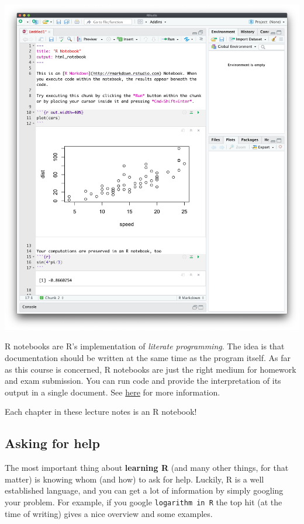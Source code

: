 \documentclass[
]{book}
\theoremstyle{definition}
\theoremstyle{definition}
\theoremstyle{definition}
\theoremstyle{definition}
\theoremstyle{remark}
\begin{document}
\begin{center}\includegraphics[width=1\linewidth,style="padding:10px"]{pics/notebooks} \end{center}

R notebooks are R's implementation of \emph{literate programming}. The idea is that documentation should be written at the same time as the program itself. As far as this course is concerned, R notebooks are just the right medium for homework and exam submission. You can run code and provide the interpretation of its output in a single document. See \href{other/Homework-instructions.html}{here} for more information.

Each chapter in these lecture notes is an R notebook!

\hypertarget{asking-for-help}{%
\subsection{Asking for help}\label{asking-for-help}}

The most important thing about \textbf{learning R} (and many other things, for that matter) is knowing whom (and how) to ask for help. Luckily, R is a well established language, and you can get a lot of information by simply googling your problem. For example, if you google \texttt{logarithm\ in\ R} the top hit (at the time of writing) gives a nice overview and some examples.
\end{document}
